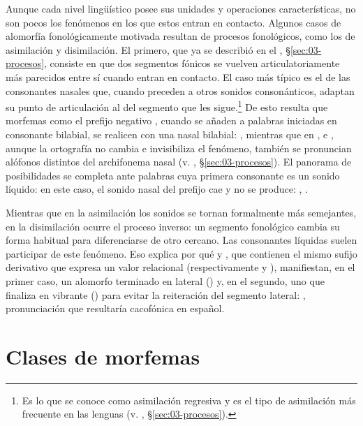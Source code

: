 Aunque cada nivel lingüístico posee sus unidades y operaciones características,
no son pocos los fenómenos en los que estos entran en contacto. Algunos casos de
alomorfía fonológicamente motivada resultan de procesos fonológicos, como los de
asimilación y disimilación. El primero, que ya se describió en el ,
§\ref{sec:03-procesos}, consiste en que dos segmentos fónicos se vuelven
articulatoriamente más parecidos entre sí cuando entran en contacto. El caso más
típico es el de las consonantes nasales que, cuando preceden a otros sonidos
consonánticos, adaptan su punto de articulación al del segmento que les
sigue.\footnote{Es lo que se conoce como asimilación regresiva y es el tipo de
asimilación más frecuente en las lenguas (v. ,
§\ref{sec:03-procesos}).} De esto resulta que morfemas como el prefijo negativo
, cuando se añaden a palabras iniciadas en consonante bilabial, se
realicen con una nasal bilabial:  , mientras
que en  , 
 e  , aunque la ortografía
no cambia e invisibiliza el fenómeno, también se pronuncian alófonos distintos
del archifonema nasal (v. , §\ref{sec:03-procesos}). El panorama de
posibilidades se completa ante palabras cuya primera consonante es un sonido
líquido: en este caso, el sonido nasal del prefijo cae y no se produce:
, .

Mientras que en la asimilación los sonidos se tornan formalmente más semejantes,
en la disimilación ocurre el proceso inverso: un segmento fonológico cambia su
forma habitual para diferenciarse de otro cercano. Las consonantes líquidas
suelen participar de este fenómeno. Eso explica por qué  y
, que contienen el mismo sufijo derivativo que expresa un valor
relacional (respectivamente  y ), manifiestan, en el primer caso, un alomorfo terminado en lateral
() y, en el segundo, uno que finaliza en vibrante () para
evitar la reiteración del segmento lateral: ,
pronunciación que resultaría cacofónica en español.

\section{Clases de morfemas}

